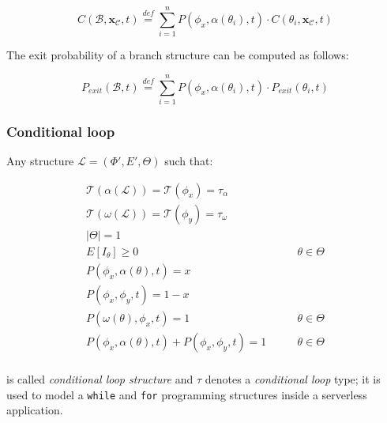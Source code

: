 \documentclass[12pt,a4paper]{report}
\newcommand{\mathDef}{\overset{\textit{def}}{=}}
\begin{document}
\begin{equation}
	C(\mathcal{B},\textbf{x}_{\mathcal{C}}, t) \mathDef \sum_{i = 1}^n P(\phi_{x}, \alpha(\theta_i),t) \cdot C(\theta_i,\textbf{x}_{\mathcal{C}}, t)
\end{equation}

The exit probability of a branch structure can be computed as follows:

\begin{equation}
	P_{exit}(\mathcal{B}, t) \mathDef \sum_{i = 1}^n P(\phi_{x}, \alpha(\theta_i),t) \cdot P_{exit}(\theta_i, t)
\end{equation}

\subsubsection{Conditional loop}

Any structure $\mathcal{L} = (\Phi',E',\Theta)$ such that:

\begin{eqnarray}
	\mathscr{T}(\alpha(\mathcal{L})) = \mathscr{T}(\phi_x) = \tau_{\alpha} \\ \mathscr{T}(\omega(\mathcal{L})) = \mathscr{T}(\phi_y) = \tau_{\omega} \\
	|\Theta| = 1  & \\
	E[I_{\theta}] \geq 0 & \qquad \theta \in \Theta \\
	P(\phi_{x}, \alpha(\theta), t) = x & \\
	P(\phi_{x}, \phi_{y},t) = 1 - x & \\
	P(\omega(\theta), \phi_{x},t) = 1 & \qquad \theta \in \Theta \\
	P(\phi_x, \alpha(\theta),t) + P(\phi_{x}, \phi_{y},t) = 1 & \qquad \theta \in \Theta \\
\end{eqnarray}

is called \textit{conditional loop structure} and $\tau$ denotes a \textit{conditional loop} type; it is used to model a \texttt{while} and \texttt{for} programming structures inside a serverless application. 
\end{document}

